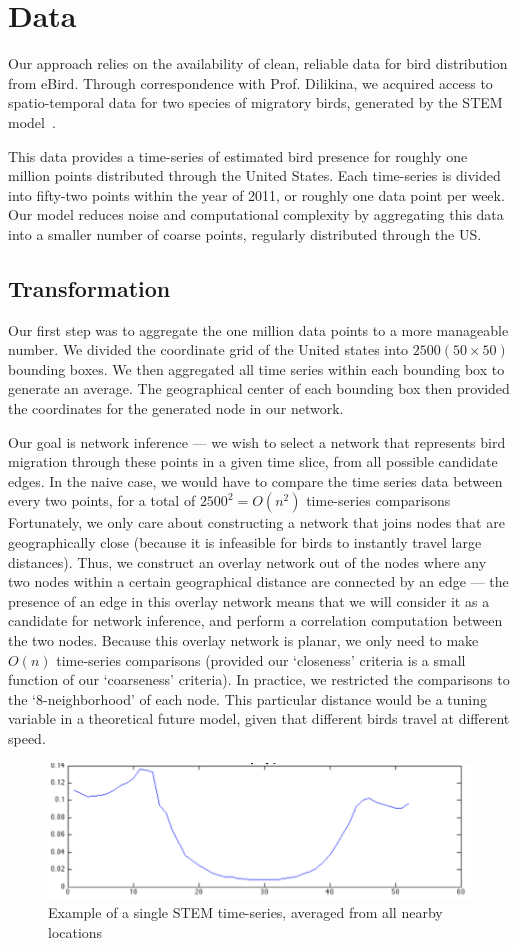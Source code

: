 \section{Data}
Our approach relies on the availability of clean, reliable data for bird distribution from eBird. Through correspondence with Prof. Dilikina, we acquired access to spatio-temporal data for two species of migratory birds, generated by the STEM model~\cite{stem}. 

This data provides a time-series of estimated bird presence for roughly one million points distributed through the United States. Each time-series is divided into fifty-two points within the year of 2011, or roughly one data point per week. Our model reduces noise and computational complexity by aggregating this data into a smaller number of coarse points, regularly distributed through the US. 


\subsection{Transformation}
Our first step was to aggregate the one million data points to a more manageable number. We divided the coordinate grid of the United states into $2500 (50 \times 50)$ bounding boxes. We then aggregated all time series within each bounding box to generate an average. The geographical center of each bounding box then provided the coordinates for the generated node in our network. 

Our goal is network inference --- we wish to select a network that represents bird migration through these points in a given time slice, from all possible candidate edges. In the naive case, we would have to compare the time series data between every two points, for a total of $2500^2 = O(n^2)$ time-series comparisons Fortunately, we only care about constructing a network that joins nodes that are geographically close (because it is infeasible for birds to instantly travel large distances). Thus, we construct an overlay network out of the nodes where any two nodes within a certain geographical distance are connected by an edge --- the presence of an edge in this overlay network means that we will consider it as a candidate for network inference, and perform a correlation computation between the two nodes. Because this overlay network is planar, we only need to make $O(n)$ time-series comparisons (provided our `closeness' criteria is a small function of our `coarseness' criteria). In practice, we restricted the comparisons to the `8-neighborhood' of each node. This particular distance would be a tuning variable in a theoretical future model, given that different birds travel at different speed. 

\begin{figure}[h!]
\centering
\includegraphics[scale=0.65] {ts}
\caption[Caption for]{Example of a single STEM time-series, averaged from all nearby locations}
\label{fig:00}
\end{figure}
